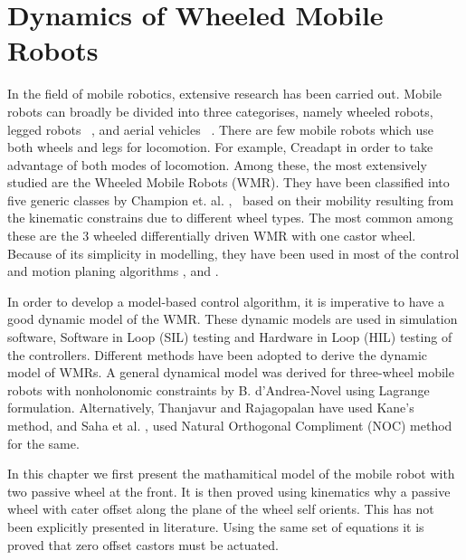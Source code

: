 \chapter{Dynamics of Wheeled Mobile Robots }
\label{c4_Dynamics}
In the field of mobile robotics, extensive research has been carried out. 
Mobile robots can broadly be divided into three categorises, namely wheeled robots, legged robots ~\cite{machado2006overview}, and aerial vehicles ~\cite{valavanis2014handbook}. 
There are few mobile robots which use both wheels and legs for locomotion. For example,  Creadapt  \cite{mouret2015evolutionary} in order to take advantage of both modes of locomotion. 
Among these, the most extensively studied are the  Wheeled Mobile Robots (WMR). 
They have been classified into five generic classes by Champion et. al. \cite{campion1996structural},~\cite{campion2008wheeled}  based on their mobility resulting from the kinematic constrains due to  different wheel types.
 The most common among these are the  3 wheeled differentially driven WMR with one castor wheel.
  Because of its simplicity in modelling, they have been used in most of the  control and motion planing algorithms  \cite{desantis1995modeling}, \cite{koh1999smooth} and \cite{d1995control}. 

In order to develop a model-based control algorithm, it is imperative to have a good dynamic model of the WMR.
 These dynamic models are used in  simulation software,  Software in Loop (SIL) testing and Hardware in Loop (HIL) testing  of the controllers.
 Different methods have  been adopted to derive the dynamic model of WMRs.
  A general dynamical model was derived for three-wheel mobile robots with nonholonomic constraints  by B. d'Andrea-Novel \cite{d1991modelling} using  Lagrange formulation.
    Alternatively, Thanjavur and Rajagopalan \cite{thanjavur1997ease} have used Kane's method,  and  Saha et al. \cite{saha1991dynamics},\cite{saha1989kinematics} used Natural Orthogonal Compliment (NOC) method for the same.  
    
In this chapter we first present the mathamitical model of the mobile robot with two passive wheel at the front. It is then proved using kinematics why a passive wheel with cater offset along the plane of the wheel self orients. This has not been explicitly presented in literature. Using the same set of equations it is proved that zero offset castors must be actuated. 

   
 
